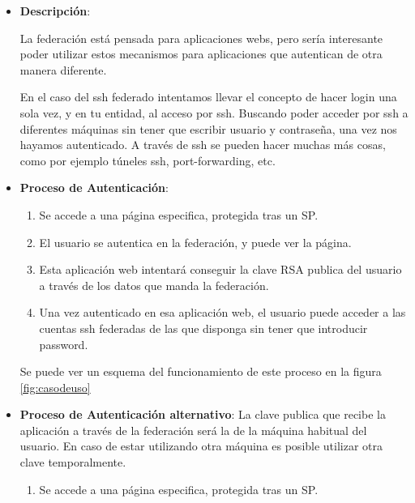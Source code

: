     \begin{itemize}

    \item \textbf{Descripción}:
    
    La federación está pensada para aplicaciones webs, pero sería
    interesante poder utilizar estos mecanismos para aplicaciones que
    autentican de otra manera diferente.

    En el caso del ssh federado intentamos llevar el concepto de hacer
    login una sola vez, y en tu entidad, al acceso por ssh. Buscando poder
    acceder por ssh a diferentes máquinas sin tener que escribir usuario y
    contraseña, una vez nos hayamos autenticado.  A través de ssh se pueden
    hacer muchas más cosas, como por ejemplo túneles ssh, port-forwarding,
    etc.

    \item \textbf{Proceso de Autenticación}:

    \begin{enumerate}

        \item Se accede a una página especifica, protegida tras un SP.

        \item El usuario se autentica en la federación, y puede ver la
        página.

        \item Esta aplicación web intentará conseguir la clave RSA publica
        del usuario a través de los datos que manda la federación.

        \item Una vez autenticado en esa aplicación web, el usuario puede
        acceder a las cuentas ssh federadas de las que disponga sin tener
        que introducir password.

    \end{enumerate}

    Se puede ver un esquema del funcionamiento de este proceso en la figura
    \ref{fig:casodeuso}

    \item \textbf{Proceso de Autenticación alternativo}:
    La clave publica que recibe la aplicación a través de la federación
    será la de la máquina habitual del usuario. En caso de estar utilizando
    otra máquina es posible utilizar otra clave temporalmente.

    \begin{enumerate}

        \item Se accede a una página especifica, protegida tras un SP.


\end{enumerate}
\end{itemize}
